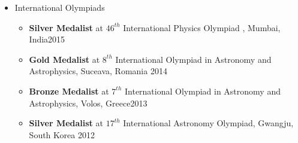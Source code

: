 \documentclass[a4paper,10pt]{article}
\begin{document}
\begin{itemize}
\item International Olympiads
\begin{itemize}
    \item \textbf{Silver Medalist} at $46^{th}$ International Physics Olympiad , Mumbai, India\hfill 2015
    \item \textbf{Gold Medalist} at $8^{th}$ International Olympiad in Astronomy and Astrophysics, Suceava, Romania \hfill 2014
    \item \textbf{Bronze Medalist} at $7^{th}$ International Olympiad in Astronomy and Astrophysics, Volos, Greece\hfill 2013
    \item \textbf{Silver Medalist} at $17^{th}$ International Astronomy Olympiad, Gwangju, South Korea \hfill 2012
\end{itemize}
\end{itemize}
     
\vspace{-6pt}
\end{document}
